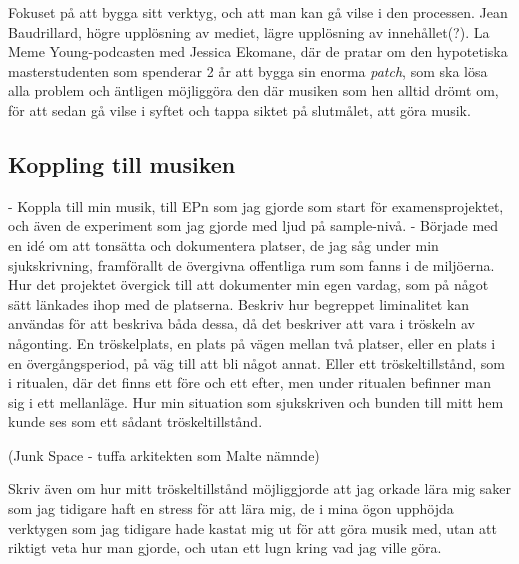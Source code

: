 \documentclass{article}
\begin{document}
  Fokuset på att bygga sitt verktyg, och att man kan gå vilse i den processen. Jean Baudrillard, högre
  upplösning av mediet, lägre upplösning av innehållet(?). 
  La Meme Young-podcasten med Jessica Ekomane, där de pratar om den hypotetiska masterstudenten som spenderar
  2 år att bygga sin enorma \emph{patch}, som ska lösa alla problem och äntligen möjliggöra den där musiken
  som hen alltid drömt om, för att sedan gå vilse i syftet och tappa siktet på slutmålet, att göra musik. 




\subsection{Koppling till musiken}
- Koppla till min musik, till EPn som jag gjorde som start för examensprojektet, och även de experiment som
  jag gjorde med ljud på sample-nivå. 
- Började med en idé om att tonsätta och dokumentera platser, de jag såg under min sjukskrivning, framförallt
  de övergivna offentliga rum som fanns i de miljöerna. Hur det projektet övergick till att dokumenter min
  egen vardag, som på något sätt länkades ihop med de platserna. Beskriv hur begreppet liminalitet kan
  användas för att beskriva båda dessa, då det beskriver att vara i tröskeln av någonting. En tröskelplats, en
  plats på vägen mellan två platser, eller en plats i en övergångsperiod, på väg till att bli något annat.
  Eller ett tröskeltillstånd, som i ritualen, där det finns ett före och ett efter, men under ritualen
  befinner man sig i ett mellanläge. Hur min situation som sjukskriven och bunden till mitt hem kunde ses som
  ett sådant tröskeltillstånd. 
  
  (Junk Space - tuffa arkitekten som Malte nämnde)

  Skriv även om hur mitt tröskeltillstånd möjliggjorde att jag orkade lära mig saker som jag tidigare haft en
  stress för att lära mig, de i mina ögon upphöjda verktygen som jag tidigare hade kastat mig ut för att göra
  musik med, utan att riktigt veta hur man gjorde, och utan ett lugn kring vad jag ville göra.
\end{document}

